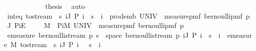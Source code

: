 \begin{isabellebody}
\ \ \ \ \isacommand{{\isacharbraceright}{\kern0pt}}\isamarkupfalse%
\isanewline
\ \ \ \ \isamarkupfalse%
\ \isamarkupfalse%
\ {\isacharquery}{\kern0pt}thesis\ \isamarkupfalse%
\ auto\isanewline
\ \ \isamarkupfalse%
\isanewline
\ \ \isamarkupfalse%
\ \isamarkupfalse%
\ inteq{\isacharcolon}{\kern0pt}\ {\isachardoublequoteopen}{\isacharparenleft}{\kern0pt}to{\isacharunderscore}{\kern0pt}stream\ {\isacharminus}{\kern0pt}{\isacharbackquote}{\kern0pt}\ {\isacharbraceleft}{\kern0pt}s{\isachardot}{\kern0pt}\ {\isasymforall}i{\isasymin}J{\isachardot}{\kern0pt}\ P\ i\ {\isacharequal}{\kern0pt}\ s\ {\isacharbang}{\kern0pt}{\isacharbang}{\kern0pt}\ i{\isacharbraceright}{\kern0pt}{\isacharparenright}{\kern0pt}\ {\isacharequal}{\kern0pt}\ prod{\isacharunderscore}{\kern0pt}emb\ UNIV\ {\isacharparenleft}{\kern0pt}{\isasymlambda}{\isacharunderscore}{\kern0pt}{\isachardot}{\kern0pt}\ measure{\isacharunderscore}{\kern0pt}pmf\ {\isacharparenleft}{\kern0pt}bernoulli{\isacharunderscore}{\kern0pt}pmf\ p{\isacharparenright}{\kern0pt}{\isacharparenright}{\kern0pt}\ J\ {\isacharquery}{\kern0pt}PiE{\isachardoublequoteclose}\ \isacommand{{\isachardot}{\kern0pt}}\isamarkupfalse%
\isanewline
\ \ \isamarkupfalse%
\ {\isacharquery}{\kern0pt}M\ {\isacharequal}{\kern0pt}\ {\isachardoublequoteopen}{\isacharparenleft}{\kern0pt}Pi\isactrlsub M\ UNIV\ {\isacharparenleft}{\kern0pt}{\isasymlambda}{\isacharunderscore}{\kern0pt}{\isachardot}{\kern0pt}\ measure{\isacharunderscore}{\kern0pt}pmf\ {\isacharparenleft}{\kern0pt}bernoulli{\isacharunderscore}{\kern0pt}pmf\ p{\isacharparenright}{\kern0pt}{\isacharparenright}{\kern0pt}{\isacharparenright}{\kern0pt}{\isachardoublequoteclose}\isanewline
\ \ \isamarkupfalse%
\ {\isachardoublequoteopen}emeasure\ {\isacharparenleft}{\kern0pt}bernoulli{\isacharunderscore}{\kern0pt}stream\ p{\isacharparenright}{\kern0pt}\ {\isacharbraceleft}{\kern0pt}s\ {\isasymin}\ space\ {\isacharparenleft}{\kern0pt}bernoulli{\isacharunderscore}{\kern0pt}stream\ p{\isacharparenright}{\kern0pt}{\isachardot}{\kern0pt}\ {\isasymforall}i{\isasymin}J{\isachardot}{\kern0pt}\ P\ i\ {\isacharequal}{\kern0pt}\ s\ {\isacharbang}{\kern0pt}{\isacharbang}{\kern0pt}\ i{\isacharbraceright}{\kern0pt}\ {\isacharequal}{\kern0pt}\ emeasure\ {\isacharquery}{\kern0pt}M\ {\isacharparenleft}{\kern0pt}to{\isacharunderscore}{\kern0pt}stream\ {\isacharminus}{\kern0pt}{\isacharbackquote}{\kern0pt}\ {\isacharbraceleft}{\kern0pt}s{\isachardot}{\kern0pt}\ {\isasymforall}i{\isasymin}J{\isachardot}{\kern0pt}\ P\ i\ \ {\isacharequal}{\kern0pt}\ s\ {\isacharbang}{\kern0pt}{\isacharbang}{\kern0pt}\ i{\isacharbraceright}{\kern0pt}{\isacharparenright}{\kern0pt}{\isachardoublequoteclose}\isanewline

\end{isabellebody}

